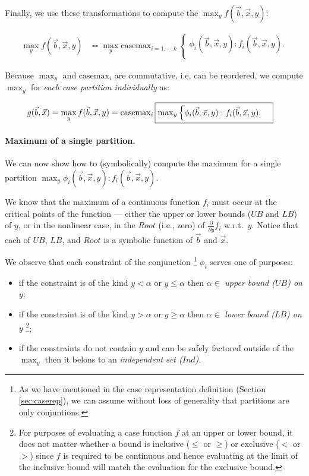 \documentclass[twoside,11pt]{article}
\newcommand{\casemax}{\mathrm{casemax}}
\newcommand{\UB}{\mathit{UB}}
\newcommand{\LB}{\mathit{LB}}
\newcommand{\IND}{\mathit{Ind}}
\newcommand{\Root}{\mathit{Root}}
\begin{document}
Finally, we use these transformations to compute the $\max_y f(\vec{b},\vec{x},y)$:

\begin{align}
\max_y f(\vec{b},\vec{x},y) & = 
\max_y \casemax_{i=1,\cdots,k} \, \begin{cases}
\phi_i(\vec{b},\vec{x},y) : f_i(\vec{b},\vec{x},y). \nonumber \\
\end{cases} 
\end{align} 

Because 
$\max_y$ and $\casemax_i$ are commutative, i.e, can be reordered,
we compute $\max_y$ for \emph{each case partition
individually} as:  

\begin{align}
g(\vec{b},\vec{x}) = \max_y f(\vec{b},\vec{x},y)& = \casemax_i \, \fbox{$\max_y \begin{cases}
\phi_i(\vec{b},\vec{x},y) : f_i(\vec{b},\vec{x},y). \\
\end{cases}$} \label{eq:casemax_max}
\end{align} 


\paragraph{Maximum of a single partition.} We can now show how to (symbolically) compute the maximum for a single partition 
$\max_y \phi_i(\vec{b},\vec{x},y): f_i(\vec{b},\vec{x},y)$.

We know that the maximum of a continuous function $f_i$ must occur at the critical points of the function --- 
either the upper or lower bounds ($\UB$ and $\LB$) of $y$, 
or in the nonlinear case, in the $\Root$ (i.e., zero) of $\frac{\partial}{\partial y} f_i$ 
w.r.t.\ $y$.  Notice that each of $\UB$, $\LB$, and $\Root$
is a symbolic function of $\vec{b}$ and $\vec{x}$. 

We observe that each constraint of the conjunction \footnote{As we have mentioned in the case representation definition (Section \ref{sec:caserep}), we can assume without loss of generality that partitions are only conjuntions.} $\phi_i$ serves one of
purposes: 
\begin{itemize}
\item if the constraint is of the kind
$y < \alpha$ or $y \leq \alpha$ then 
$\alpha \in$ \emph{upper bound ($\UB$) on $y$};
\item if the constraint is of the kind
$y >\alpha$ or $y \geq \alpha$ then
$\alpha \in$ \emph{lower bound ($\LB$) on $y$}
\footnote{For purposes of evaluating
a case function $f$ at an upper or lower bound,
it does not matter whether a bound is inclusive ($\leq$ or $\geq$)
or exclusive ($<$ or $>$) since $f$ is required to be continuous
and hence evaluating at the limit of the inclusive bound will
match the evaluation for the exclusive bound.};
\item if the constraints do not contain $y$
and can be safely factored outside of the $\max_y$ then it belons to an \emph{independent set ($\IND$)}. 
\end{itemize}
\end{document}

